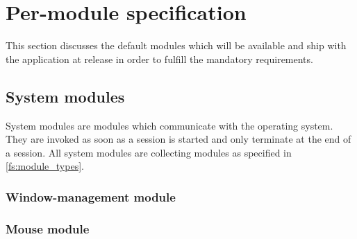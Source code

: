 \section{Per-module specification}

This section discusses the default \glspl{module} which will be available and ship with the application at release in order to fulfill the mandatory requirements.

\subsection{System modules}
System \glspl{module} are \glspl{module} which communicate with the operating system. They are invoked as soon as a \gls{session} is started and only terminate at the end of a \gls{session}. All system \glspl{module} are collecting \glspl{module} as specified in \ref{fs:module_types}.

\subsubsection{Window-management module}

\begin{specifications}
\end{specifications}

\subsubsection{Mouse module}

\begin{specifications}
\end{specifications}

